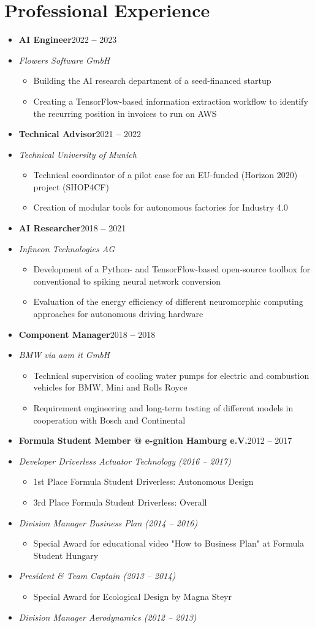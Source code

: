 \documentclass[a4paper,11pt]{article}
\newcommand{\entryBf}[2]{\item \textbf{#1}\hfill #2\vspace{-9pt}}
\newcommand{\entryIt}[1]{\item \textit{\small #1}\vspace{-7pt}}
\newcommand{\cvItemizeBegin}{\begin{itemize}[rightmargin=75pt]}
\newcommand{\cvItemizeEnd}{\end{itemize} \vspace{-7pt}}
\newcommand{\cvItem}[1]{\item[--] \small #1\vspace{-2pt}}
\begin{document}
\section{Professional Experience}
\begin{itemize}
    
    \entryBf{AI Engineer}{2022 \textbf{--} 2023}
    \entryIt{Flowers Software GmbH}
    \cvItemizeBegin
        \cvItem{Building the AI research department of a seed-financed startup}
        \cvItem{Creating a TensorFlow-based information extraction workflow to identify the recurring position in invoices to run on AWS}
    \cvItemizeEnd

    \entryBf{Technical Advisor}{2021 \textbf{--} 2022}
    \entryIt{Technical University of Munich}
    \cvItemizeBegin
        \cvItem{Technical coordinator of a pilot case for an EU-funded (Horizon 2020) project (SHOP4CF)}
        \cvItem{Creation of modular tools for autonomous factories for Industry 4.0}
    \cvItemizeEnd

    \entryBf{AI Researcher}{2018 \textbf{--} 2021}
    \entryIt{Infineon Technologies AG}
    \cvItemizeBegin
        \cvItem{Development of a Python- and TensorFlow-based open-source toolbox for conventional to spiking neural network conversion}
        \cvItem{Evaluation of the energy efficiency of different neuromorphic computing approaches for autonomous driving hardware}
    \cvItemizeEnd
    
    \entryBf{Component Manager}{2018 \textbf{--} 2018}
    \entryIt{BMW via aam it GmbH}
    \cvItemizeBegin
        \cvItem{Technical supervision of cooling water pumps for electric and combustion vehicles for BMW, Mini and Rolls Royce}
        \cvItem{Requirement engineering and long-term testing of different models in cooperation with Bosch and Continental}
    \cvItemizeEnd
    
    \entryBf{Formula Student Member @ e-gnition Hamburg e.V.}{2012 {--} 2017}
    \entryIt{Developer Driverless Actuator Technology (2016 -- 2017)}
    \cvItemizeBegin
        \cvItem{1st Place Formula Student Driverless: Autonomous Design}
        \cvItem{3rd Place Formula Student Driverless: Overall}
    \cvItemizeEnd
    \vspace{-4pt}
    \entryIt{Division Manager Business Plan (2014 -- 2016)}
    \cvItemizeBegin
        \cvItem{Special Award for educational video "How to Business Plan" at Formula Student Hungary}
    \cvItemizeEnd
    \vspace{-4pt}
    \entryIt{President \& Team Captain (2013 -- 2014)}
    \cvItemizeBegin
        \cvItem{Special Award for Ecological Design by Magna Steyr}
    \cvItemizeEnd
    \vspace{-4pt}
    \entryIt{Division Manager Aerodynamics (2012 -- 2013)}
    \vspace{2pt}
    

\end{itemize}
\end{document}
